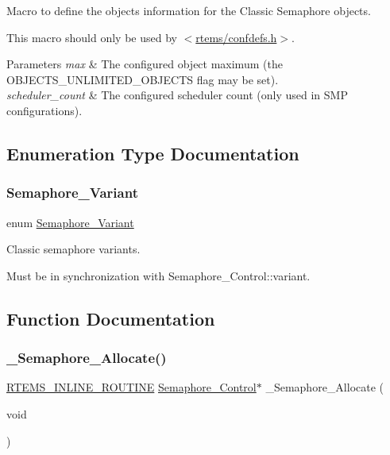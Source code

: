 Macro to define the objects information for the Classic Semaphore objects. 

This macro should only be used by $<$\mbox{\hyperlink{confdefs_8h}{rtems/confdefs.\+h}}$>$.


\begin{DoxyParams}{Parameters}
{\em max} & The configured object maximum (the O\+B\+J\+E\+C\+T\+S\+\_\+\+U\+N\+L\+I\+M\+I\+T\+E\+D\+\_\+\+O\+B\+J\+E\+C\+TS flag may be set). \\
\hline
{\em scheduler\+\_\+count} & The configured scheduler count (only used in S\+MP configurations). \\
\hline
\end{DoxyParams}


\subsection{Enumeration Type Documentation}
\mbox{\label{group__ClassicSemImpl_gab9531c36f1845c14f2dfc5006fd3dee9}} 
\subsubsection{\texorpdfstring{Semaphore\_Variant}{Semaphore\_Variant}}
{\footnotesize\ttfamily enum \mbox{\hyperlink{group__ClassicSemImpl_gab9531c36f1845c14f2dfc5006fd3dee9}{Semaphore\+\_\+\+Variant}}}



Classic semaphore variants. 

Must be in synchronization with Semaphore\+\_\+\+Control\+::variant. 

\subsection{Function Documentation}
\mbox{\label{group__ClassicSemImpl_gad485fdb4409216acbb4e339c2fd57889}} 
\subsubsection{\texorpdfstring{\_Semaphore\_Allocate()}{\_Semaphore\_Allocate()}}
{\footnotesize\ttfamily \mbox{\hyperlink{group__RTEMSScoreBaseDefs_gac216239df231d5dbd15e3520b0b9313f}{R\+T\+E\+M\+S\+\_\+\+I\+N\+L\+I\+N\+E\+\_\+\+R\+O\+U\+T\+I\+NE}} \mbox{\hyperlink{structSemaphore__Control}{Semaphore\+\_\+\+Control}}$\ast$ \+\_\+\+Semaphore\+\_\+\+Allocate (\begin{DoxyParamCaption}\item[{void}]{ }\end{DoxyParamCaption})}



